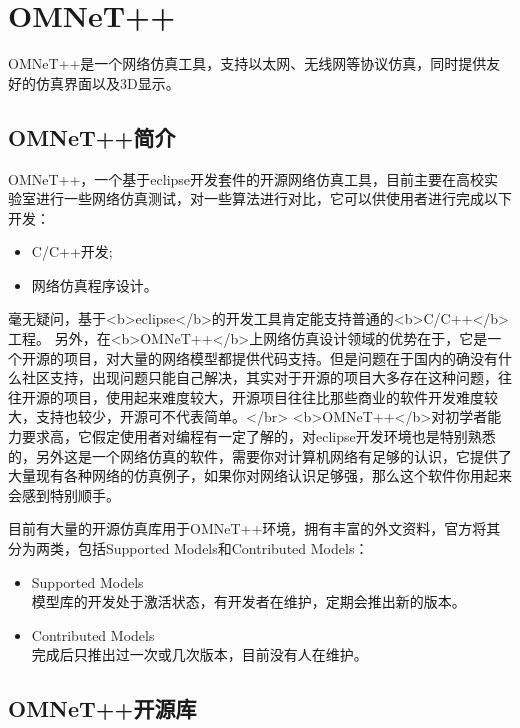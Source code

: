 \chapter{OMNeT++}

\begin{summary}
OMNeT++是一个网络仿真工具，支持以太网、无线网等协议仿真，同时提供友好的仿真界面以及3D显示。
\\
\end{summary}

\section{OMNeT++简介}

OMNeT++，一个基于eclipse开发套件的开源网络仿真工具，目前主要在高校实验室进行一些网络仿真测试，对一些算法进行对比，它可以供使用者进行完成以下开发：
\begin{itemize}
\item C/C++开发;
\item 网络仿真程序设计。
\end{itemize}

毫无疑问，基于<b>eclipse</b>的开发工具肯定能支持普通的<b>C/C++</b>工程。
另外，在<b>OMNeT++</b>上网络仿真设计领域的优势在于，它是一个开源的项目，对大量的网络模型都提供代码支持。但是问题在于国内的确没有什么社区支持，出现问题只能自己解决，其实对于开源的项目大多存在这种问题，往往开源的项目，使用起来难度较大，开源项目往往比那些商业的软件开发难度较大，支持也较少，开源可不代表简单。</br>
<b>OMNeT++</b>对初学者能力要求高，它假定使用者对编程有一定了解的，对eclipse开发环境也是特别熟悉的，另外这是一个网络仿真的软件，需要你对计算机网络有足够的认识，它提供了大量现有各种网络的仿真例子，如果你对网络认识足够强，那么这个软件你用起来会感到特别顺手。

目前有大量的开源仿真库用于OMNeT++环境，拥有丰富的外文资料，官方将其分为两类，包括Supported Models和Contributed Models：
\begin{itemize}
	\item Supported Models \\
	模型库的开发处于激活状态，有开发者在维护，定期会推出新的版本。
	\item Contributed Models \\
	完成后只推出过一次或几次版本，目前没有人在维护。
\end{itemize}


\section{OMNeT++开源库}


